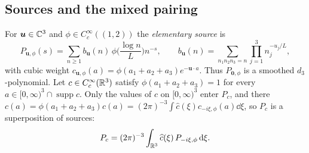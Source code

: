 \documentclass[11pt,colorlinks]{charlie}
\begin{document}
\subsection{Sources and the mixed pairing}
For $\boldsymbol u\in\mathbb{C}^3$ and $\phi\in C_c^\infty((1,2))$ the \emph{elementary source} is
\[
 P_{\boldsymbol u,\phi}(s)=\sum_{n\ge1}b_{\boldsymbol u}(n)\,\phi\Big(\frac{\log n}L\Big)n^{-s},\qquad b_{\boldsymbol u}(n)=\sum_{n_1n_2n_3=n}\prod_{j=1}^3n_j^{-u_j/L},
\]
with cubic weight $c_{\boldsymbol u,\phi}(a)=\phi(a_1+a_2+a_3)e^{-\boldsymbol u\cdot a}$. Thus $P_{\boldsymbol 0,\phi}$ is a smoothed $d_3$-polynomial. Let $c\in C_c^\infty(\mathbb{R}^3)$ satisfy $\phi(a_1+a_2+a_3)=1$ for every $a\in[0,\infty)^3\cap\operatorname{supp}c$. Only the values of $c$ on $[0,\infty)^3$ enter $P_c$, and there $c(a)=\phi(a_1+a_2+a_3)c(a)=(2\pi)^{-3}\int\widehat c(\xi)c_{-i\xi,\phi}(a)\dd\xi$, so $P_c$ is a superposition of sources:
\begin{equation}\label{eq:sourcesuperposition}
 P_c=(2\pi)^{-3}\int_{\mathbb{R}^3}\widehat c(\xi)\,P_{-i\xi,\phi}\,\mathrm{d}\xi .
\end{equation}
\end{document}
